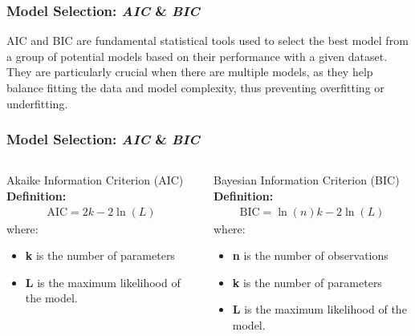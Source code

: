 \documentclass[aspectratio=169,hyperref={pdfpagelabels=false}]{beamer}
\begin{document}
\begin{frame}
  \frametitle{Model Selection: \textit{AIC} \& \textit{BIC}}

  AIC and BIC are fundamental statistical tools used to select the best model from a group of potential models based on their performance with a given dataset. 
  They are particularly crucial when there are multiple models, as they help balance fitting the data and model complexity, thus preventing overfitting or underfitting.
\end{frame}


\begin{frame}
  \frametitle{Model Selection: \textit{AIC} \& \textit{BIC}}
  \begin{columns}
    \begin{column}{0.5\textwidth}
      \begin{block}{Akaike Information Criterion (AIC)}
        \textbf{Definition:} 
        \begin{align*}
          \boxed{\text{AIC} = 2k - 2\ln(L)}
        \end{align*}
          where: 
        \begin{itemize}
          \item \textbf{k} is the number of parameters
          \item \textbf{L} is the maximum likelihood of the model.
        \end{itemize}
        \vspace{1.5em}
      \end{block}
    \end{column}
    
    \begin{column}{0.5\textwidth}
      \begin{block}{Bayesian Information Criterion (BIC)}
        \textbf{Definition:}
        \begin{align*}
          \boxed{\text{BIC} = \ln(n)k - 2\ln(L)}
        \end{align*} 
        where: 
        \begin{itemize}
          \item  \textbf{n} is the number of observations
          \item \textbf{k} is the number of parameters
          \item \textbf{L} is the maximum likelihood of the model.
          
        \end{itemize}
      \end{block}
    \end{column}
  \end{columns}
\end{frame}
\end{document}
